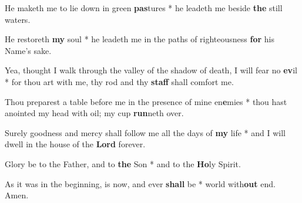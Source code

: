 \begin{multicols}{2}
	He maketh me to lie down in green \textbf{pas}tures * he leadeth me beside \textbf{the} still waters.
	
	He restoreth \textbf{my} soul * he leadeth me in the paths of righteousness \textbf{for} his Name's sake.
	
	Yea, thought I walk through the valley of the shadow of death, I will fear no \textbf{ev}il * for thou art with me, thy rod and thy \textbf{staff} shall comfort me.
	
	Thou preparest a table before me in the presence of mine en\textbf{e}mies * thou hast anointed my head with oil; my cup \textbf{run}neth over.
	
	Surely goodness and mercy shall follow me all the days of \textbf{my} life * and I will dwell in the house of the \textbf{Lord} forever.
	
	Glory be to the Father, and to \textbf{the} Son * and to the \textbf{Ho}ly Spirit.
	
	As it was in the beginning, is now, and ever \textbf{shall} be * world with\textbf{out} end. Amen.
\end{multicols}